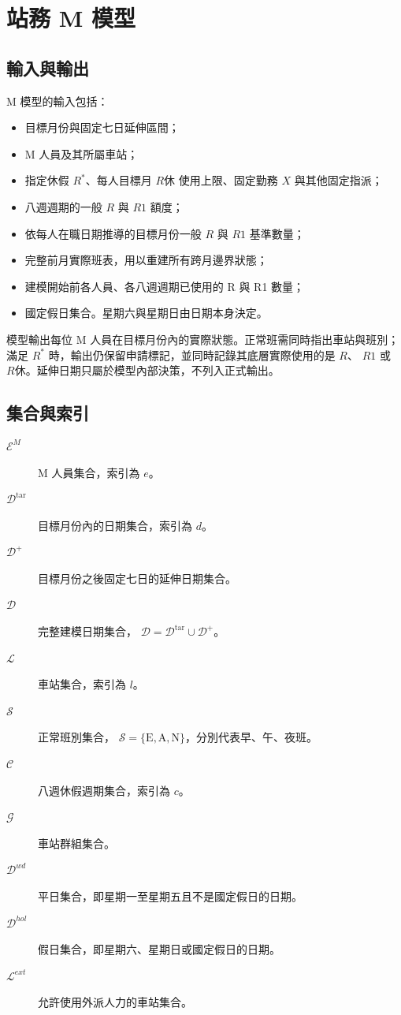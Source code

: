 \documentclass[a4paper,12pt]{article}
\begin{document}
\section{站務 M 模型}

\subsection{輸入與輸出}

M 模型的輸入包括：
\begin{itemize}
  \item 目標月份與固定七日延伸區間；
  \item M 人員及其所屬車站；
  \item 指定休假 \(R^*\)、每人目標月 \(R休\) 使用上限、固定勤務 \(X\) 與其他固定指派；
  \item 八週週期的一般 \(R\) 與 \(R1\) 額度；
  \item 依每人在職日期推導的目標月份一般 \(R\) 與 \(R1\) 基準數量；
  \item 完整前月實際班表，用以重建所有跨月邊界狀態；
  \item 建模開始前各人員、各八週週期已使用的 R 與 R1 數量；
  \item 國定假日集合。星期六與星期日由日期本身決定。
\end{itemize}

模型輸出每位 M 人員在目標月份內的實際狀態。正常班需同時指出車站與班別；
滿足 \(R^*\) 時，輸出仍保留申請標記，並同時記錄其底層實際使用的是 \(R\)、
\(R1\) 或 \(R休\)。延伸日期只屬於模型內部決策，不列入正式輸出。

\subsection{集合與索引}

\begin{description}
  \item[\(\mathcal{E}^{M}\)] M 人員集合，索引為 \(e\)。
  \item[\(\mathcal{D}^{\mathrm{tar}}\)] 目標月份內的日期集合，索引為 \(d\)。
  \item[\(\mathcal{D}^{+}\)] 目標月份之後固定七日的延伸日期集合。
  \item[\(\mathcal{D}\)] 完整建模日期集合，
    \(\mathcal{D}=\mathcal{D}^{\mathrm{tar}}\cup\mathcal{D}^{+}\)。
  \item[\(\mathcal{L}\)] 車站集合，索引為 \(l\)。
  \item[\(\mathcal{S}\)] 正常班別集合，
    \(\mathcal{S}=\{\mathrm{E},\mathrm{A},\mathrm{N}\}\)，分別代表早、午、夜班。
  \item[\(\mathcal{C}\)] 八週休假週期集合，索引為 \(c\)。
  \item[\(\mathcal{G}\)] 車站群組集合。
  \item[\(\mathcal{D}^{wd}\)] 平日集合，即星期一至星期五且不是國定假日的日期。
  \item[\(\mathcal{D}^{hol}\)] 假日集合，即星期六、星期日或國定假日的日期。
  \item[\(\mathcal{L}^{ext}\)] 允許使用外派人力的車站集合。
\end{description}
\end{document}
